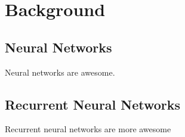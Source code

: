 \section{Background}
\subsection{Neural Networks}
Neural networks are awesome.
\subsection{Recurrent Neural Networks}
Recurrent neural networks are more awesome
